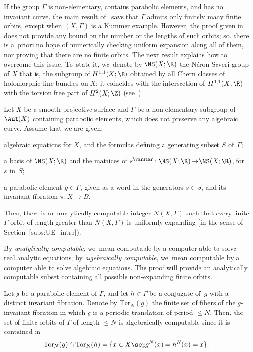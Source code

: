 If the group $\Gamma$ is non-elementary, contains parabolic elements, and has no invariant curve, the main
result of~\cite{finite_orbits} says that $\Gamma$ admits only finitely many finite orbits, except when $(X,
\Gamma)$ is a Kummer example. However, the proof given in~\cite{finite_orbits} does not provide any bound
on the number or the lengths of such orbits; so, there is a~priori no hope of numerically checking
uniform expansion along all of them, nor proving that there are no finite orbits. The next result explains how to overcome this issue.
To~state it, we~denote by $\NS(X;\R)$ the Néron-Severi group of $X$ that is, the subgroup of $H^{1,1}(X;\R)$ obtained by all Chern classes of holomorphic line bundles on $X$; it coincides with the intersection of $H^{1,1}(X;\R)$ with the torsion free part of $H^2(X;\Z)$ (see~\cite[p.\,163]{griffiths-harris}).

\begin{thm}\label{thm:effective}
Let $X$ be a smooth projective surface and
$\Gamma$ be a non-elementary subgroup of $\Aut(X)$ containing parabolic elements, which does not
preserve any algebraic curve. Assume that we are given:
\begin{enumeratei}
\item\label{thm:effectivei}
algebraic equations for $X$, and the formulas defining a generating subset $S$ of~$\Gamma$;
\item\label{thm:effectiveii}
a basis of $\NS(X;\R)$ and the matrices of $s^\varstar\colon \NS(X;\R)\!\to\! \NS(X;\R)$, for~$s$ in~$S$;
\item\label{thm:effectiveiii}
a parabolic element $g\in \Gamma$, given as a word in the generators $s\in S$,
and its invariant fibration $\pi\colon X\to B$.
\end{enumeratei}
Then, there is an analytically computable integer $N(X, \Gamma)$
such that every finite $\Gamma$\nobreakdash-orbit of length greater than $N(X,\Gamma)$ is uniformly expanding (in the sense of Section~\ref{subs:UE_intro}).
\end{thm}

By \emph{analytically computable}, we~mean
computable by a computer able to solve real analytic equations; by \emph{algebraically computable}, we~mean
computable by a computer able to solve algebraic equations. The proof will provide an analytically computable subset containing all possible non-expanding finite orbits.

\begin{example} Let $g$ be a parabolic
element of $\Gamma$, and let $h\in \Gamma$ be a conjugate of~$g$ with a distinct invariant fibration.
Denote by $\mathrm{Tor}_N(g)$ the finite set of
fibers of the $g$-invariant fibration in which $g$ is a periodic translation of period $\leq N$.
Then, the set of finite orbits of $\Gamma$ of length $\leq N$ is algebraically computable since it is contained in
\begin{equation*}
\mathrm{Tor}_N(g)\cap \mathrm{Tor}_N(h) =\{x\in X\sep  g^N(x)=h^N(x)=x \}.
\end{equation*}
\end{example}


